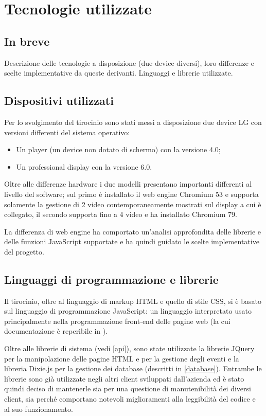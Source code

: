 \chapter{Tecnologie utilizzate}

\section{In breve}
Descrizione delle tecnologie a disposizione (due device diversi), loro differenze e scelte implementative da queste derivanti. Linguaggi e librerie utilizzate. 

\section{Dispositivi utilizzati}
Per lo svolgimento del tirocinio sono stati messi a disposizione due device LG con versioni differenti del sistema operativo:
\begin{itemize}
    \item Un player (un device non dotato di schermo) con la versione 4.0;
    \item Un professional display con la versione 6.0.
\end{itemize}

Oltre alle differenze hardware i due modelli presentano importanti differenti al livello del software; sul primo è installato il web engine Chromium 53 e supporta solamente la gestione di 2 video contemporaneamente mostrati sul display a cui è collegato, il secondo supporta fino a 4 video e ha installato Chromium 79.

La differenza di web engine ha comportato un'analisi approfondita delle librerie e delle funzioni JavaScript supportate e ha quindi guidato le scelte implementative del progetto.


\section{Linguaggi di programmazione e librerie} \label{linguaggi}

Il tirocinio, oltre al linguaggio di markup HTML e quello di stile CSS, si è basato sul linguaggio di programmazione JavaScript: un linguaggio interpretato usato principalmente nella programmazione front-end delle pagine web (la cui documentazione è reperibile in \cite{MdN}).

Oltre alle librerie di sistema (vedi \ref{api}), sono state utilizzate la librerie JQuery \cite{jQDoc} per la manipolazione delle pagine HTML e per la gestione degli eventi e la libreria Dixie.js \cite{dixie} per la gestione dei database (descritti in \ref*{database}). Entrambe le librerie sono già utilizzate negli altri client sviluppati dall'azienda ed è stato quindi deciso di mantenerle sia per una questione di manutenibilità dei diversi client, sia perché comportano notevoli miglioramenti alla leggibilità del codice e al suo funzionamento.

